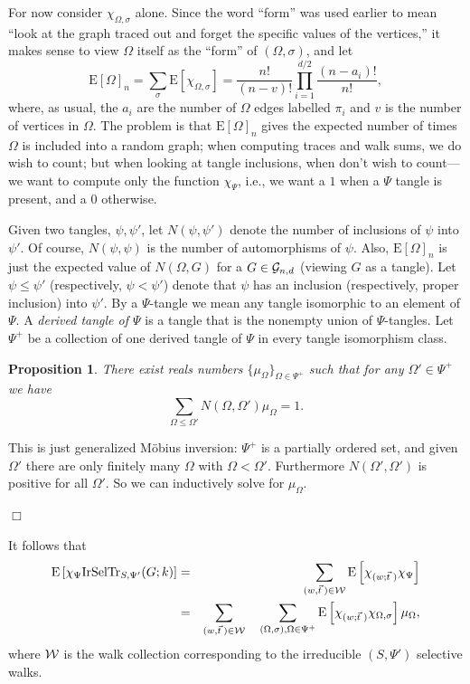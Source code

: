 \documentclass[12pt]{article}
\newtheorem{proposition}[theorem]{Proposition}
\newcommand{\mob}{\mu}
\newcommand{\cg}{{\cal G}}
\newcommand{\cgnd}{\cg_{n,d}}
\newcommand{\cw}{{\cal W}}
\newcommand{\tang}{{\psi}}	%
\newcommand{\tset}{{\Psi}}
\newcommand{\irdsel}{{\rm IrSelTr}}
\newcommand{\E}[1]{\mbox{E}\left[#1\right] }
\newcommand{\proof}{{\par\noindent {\bf Proof}\space\space}}
\newcommand{\proofbox}{\begin{flushright}$\Box$\end{flushright}}
\begin{document}
For now consider $\chi_{\Omega,\sigma}$ alone.  Since the word ``form''
was used earlier to mean ``look at the graph traced out and
forget the specific values of the vertices,''
it makes sense to view $\Omega$ itself as the ``form'' of $(\Omega,\sigma)$,
and let
$$
\E{\Omega}_n = \sum_\sigma \E{\chi_{\Omega,\sigma}}
=\frac{n!}{(n-v)!}\prod_{i=1}^{d/2} \frac{(n-a_i)!}{n!},
$$
where, as usual, the $a_i$ are the number of $\Omega$ edges labelled $\pi_i$
and $v$ is the number of vertices in $\Omega$.  The problem is that
$\E{\Omega}_n$ gives the expected number of times $\Omega$ is included
into a random graph;  when computing traces and walk sums, we do wish
to count; but when looking at tangle inclusions, when don't wish to count---
we want to compute only the function $\chi_\tset$, i.e., we want a $1$ when
a $\tset$ tangle is present, and a $0$ otherwise.

Given two tangles, $\tang,\tang'$, let $N(\tang,\tang')$ denote the
number of inclusions of $\tang$ into $\tang'$.  Of course,
$N(\tang,\tang)$ is the number of automorphisms of $\tang$.  Also,
$\E{\Omega}_n$ is just the expected value of $N(\Omega,G)$ for a 
$G\in\cgnd$ (viewing $G$ as a tangle).  Let $\tang\le\tang'$
(respectively, $\tang<\tang'$) denote that $\tang$ has an inclusion
(respectively, proper inclusion) into $\tang'$.
By a $\tset$-tangle we mean any tangle isomorphic to an element of
$\tset$.
A {\em derived tangle of $\tset$} is a tangle that is the 
nonempty union of $\tset$-tangles.  Let
$\tset^+$ be a collection of one derived tangle of $\tset$ in
every tangle isomorphism class.

\begin{proposition} There exist reals numbers $\{\mob_\Omega\}_{\Omega\in
\tset^+}$ such that for any $\Omega'\in\tset^+$ we have
$$
\sum_{\Omega\le\Omega'} N(\Omega,\Omega')\mob_\Omega = 1.
$$
\end{proposition}
\proof This is just generalized M\"obius inversion:  $\tset^+$ is a
partially ordered set, and given $\Omega'$
there are only finitely many $\Omega$
with $\Omega<\Omega'$.  Furthermore $N(\Omega',\Omega')$ is positive for
all $\Omega'$.  So we can inductively solve for $\mob_\Omega$.
\proofbox

It follows that
\begin{eqnarray}\label{eq:mother1}
\E{\chi_\tset\irdsel_{S,\tset'}(G;k)} 
&=& \sum_{(w,\vec t\>)\in\cw} \E{\chi_{(w;\vec t\;)}\chi_\tset} \\
\label{eq:mother2}
&=& \sum_{(w,\vec t\>)\in\cw}
\quad\sum_{(\Omega,\sigma),\Omega\in\tset^+}  
\E{\chi_{(w;\vec t\;)}\chi_{\Omega,\sigma}} \mob_\Omega,
\end{eqnarray}
where $\cw$ is the walk collection corresponding to the irreducible
$(S,\tset')$ selective walks.
\end{document}
